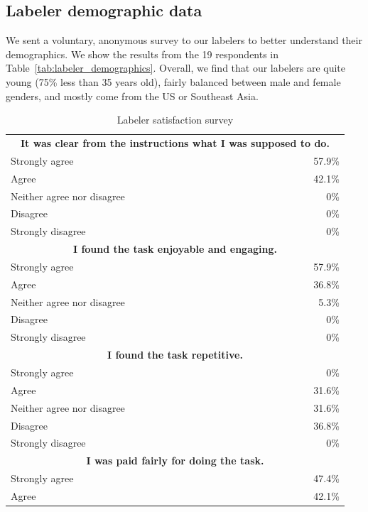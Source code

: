 \documentclass{article}
\begin{document}
\subsection{Labeler demographic data}

We sent a voluntary, anonymous survey to our labelers to better understand their demographics. We show the results from the 19 respondents in Table~\ref{tab:labeler_demographics}. Overall, we find that our labelers are quite young (75\% less than 35 years old), fairly balanced between male and female genders, and mostly come from the US or Southeast Asia.


\begin{table}[]
    \centering
    \caption{Labeler satisfaction survey}
    \label{tab:labeler_satisfaction}
    \begin{tabular}{l r}
    \toprule 
        \multicolumn{2}{c}{~~\textbf{It was clear from the instructions what I was supposed to do.}~~}\\
         Strongly agree & 57.9\% \\
         Agree & 42.1\% \\
         Neither agree nor disagree  & 0\% \\
         Disagree & 0\% \\
         Strongly disagree  & 0\% \\ \midrule 
         \multicolumn{2}{c}{\textbf{I found the task enjoyable and engaging.}}\\
         Strongly agree & 57.9\% \\
         Agree & 36.8\% \\
         Neither agree nor disagree  & 5.3\% \\
         Disagree & 0\% \\
         Strongly disagree  & 0\% \\ \midrule
         \multicolumn{2}{c}{\textbf{I found the task repetitive.}}\\
         Strongly agree & 0\% \\
         Agree & 31.6\% \\
         Neither agree nor disagree  & 31.6\% \\
         Disagree & 36.8\% \\
         Strongly disagree  & 0\% \\ \midrule
         \multicolumn{2}{c}{\textbf{I was paid fairly for doing the task.}}\\
         Strongly agree & 47.4\% \\
         Agree & 42.1\% \\

\end{tabular}
\end{table}
\end{document}
